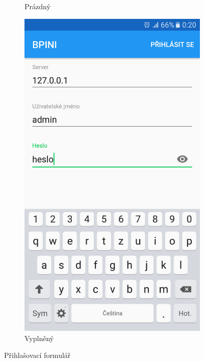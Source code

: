 \documentclass[czech,BP]{thesiskiv}
\begin{document}
\begin{figure}[H]
\begin{subfigure}[b]{0.3\textwidth}
	\caption{Prázdný}
	\label{fig:Screenshot_20170610-134211}
  \end{subfigure}
  \begin{subfigure}[b]{0.3\textwidth}
    \centering
	\includegraphics[width=\textwidth]{../images/client_android/Screenshot_20170612-002041.png}	
	\caption{Vyplněný}
	\label{fig:Screenshot_20170612-002041}
  \end{subfigure}
  \caption{Přihlašovací formulář}
\end{figure}
\end{document}
